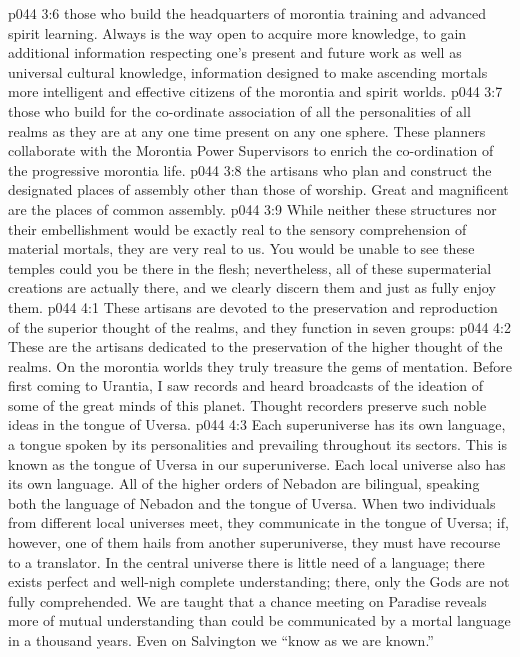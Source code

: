 \pc \vs p044 3:6 \bibnobreakspace {}those who build the headquarters of morontia training and advanced spirit learning. Always is the way open to acquire more knowledge, to gain additional information respecting one’s present and future work as well as universal cultural knowledge, information designed to make ascending mortals more intelligent and effective citizens of the morontia and spirit worlds.
\pc \vs p044 3:7 \bibnobreakspace {}those who build for the co\hyp{}ordinate association of all the personalities of all realms as they are at any one time present on any one sphere. These planners collaborate with the Morontia Power Supervisors to enrich the co\hyp{}ordination of the progressive morontia life.\plusone
\pc \vs p044 3:8 \bibnobreakspace {}the artisans who plan and construct the designated places of assembly other than those of worship. Great and magnificent are the places of common assembly.
\vs p044 3:9 While neither these structures nor their embellishment would be exactly real to the sensory comprehension of material mortals, they are very real to us. You would be unable to see these temples could you be there in the flesh; nevertheless, all of these supermaterial creations are actually there, and we clearly discern them and just as fully enjoy them.
\vs p044 4:1 These artisans are devoted to the preservation and reproduction of the superior thought of the realms, and they function in seven groups:
\pc \vs p044 4:2 \bibnobreakspace {} These are the artisans dedicated to the preservation of the higher thought of the realms. On the morontia worlds they truly treasure the gems of mentation. Before first coming to Urantia, I saw records and heard broadcasts of the ideation of some of the great minds of this planet. Thought recorders preserve such noble ideas in the tongue of Uversa.
\vs p044 4:3 Each superuniverse has its own language, a tongue spoken by its personalities and prevailing throughout its sectors. This is known as the tongue of Uversa in our superuniverse. Each local universe also has its own language. All of the higher orders of Nebadon are bilingual, speaking both the language of Nebadon and the tongue of Uversa. When two individuals from different local universes meet, they communicate in the tongue of Uversa; if, however, one of them hails from another superuniverse, they must have recourse to a translator. In the central universe there is little need of a language; there exists perfect and well\hyp{}nigh complete understanding; there, only the Gods are not fully comprehended. We are taught that a chance meeting on Paradise reveals more of mutual understanding than could be communicated by a mortal language in a thousand years. Even on Salvington we “know as we are known.”
